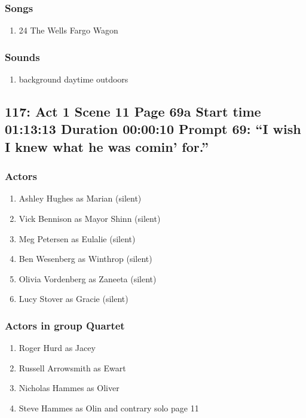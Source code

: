 \subsubsection{Songs}
\begin{enumerate}
\item 24 The Wells Fargo Wagon
\end{enumerate}\subsubsection{Sounds}
\begin{enumerate}
\item background daytime outdoors
\end{enumerate}
\subsection{117: Act 1 Scene 11 Page 69a Start time 01:13:13 Duration 00:00:10 Prompt 69: ``I wish I knew what he was comin' for.''}

\subsubsection{Actors}
\begin{enumerate}
\item Ashley Hughes as Marian (silent)
\item Vick Bennison as Mayor Shinn (silent)
\item Meg Petersen as Eulalie (silent)
\item Ben Wesenberg as Winthrop (silent)
\item Olivia Vordenberg as Zaneeta (silent)
\item Lucy Stover as Gracie (silent)
\end{enumerate}
\subsubsection{Actors in group Quartet}
\begin{enumerate}
\item Roger Hurd as Jacey
\item Russell Arrowsmith as Ewart
\item Nicholas Hammes as Oliver
\item Steve Hammes as Olin and contrary solo page 11
\end{enumerate}
